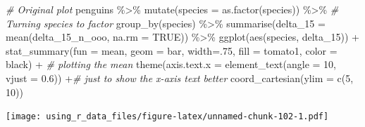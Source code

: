 \documentclass[
]{book}
\newenvironment{Shaded}{\begin{snugshade}}{\end{snugshade}}
\newcommand{\AttributeTok}[1]{\textcolor[rgb]{0.77,0.63,0.00}{#1}}
\newcommand{\CommentTok}[1]{\textcolor[rgb]{0.56,0.35,0.01}{\textit{#1}}}
\newcommand{\ConstantTok}[1]{\textcolor[rgb]{0.00,0.00,0.00}{#1}}
\newcommand{\DecValTok}[1]{\textcolor[rgb]{0.00,0.00,0.81}{#1}}
\newcommand{\FloatTok}[1]{\textcolor[rgb]{0.00,0.00,0.81}{#1}}
\newcommand{\FunctionTok}[1]{\textcolor[rgb]{0.00,0.00,0.00}{#1}}
\newcommand{\NormalTok}[1]{#1}
\newcommand{\SpecialCharTok}[1]{\textcolor[rgb]{0.00,0.00,0.00}{#1}}
\newcommand{\StringTok}[1]{\textcolor[rgb]{0.31,0.60,0.02}{#1}}
\begin{document}
\begin{Shaded}
\begin{Highlighting}[]
\CommentTok{\# Original plot}
\NormalTok{penguins }\SpecialCharTok{\%\textgreater{}\%} 
  \FunctionTok{mutate}\NormalTok{(}\AttributeTok{species =} \FunctionTok{as.factor}\NormalTok{(species)) }\SpecialCharTok{\%\textgreater{}\%}  \CommentTok{\# Turning species to factor}
  \FunctionTok{group\_by}\NormalTok{(species) }\SpecialCharTok{\%\textgreater{}\%} 
  \FunctionTok{summarise}\NormalTok{(}\AttributeTok{delta\_15 =} \FunctionTok{mean}\NormalTok{(delta\_15\_n\_ooo, }\AttributeTok{na.rm =} \ConstantTok{TRUE}\NormalTok{)) }\SpecialCharTok{\%\textgreater{}\%} 
  \FunctionTok{ggplot}\NormalTok{(}\FunctionTok{aes}\NormalTok{(species, delta\_15)) }\SpecialCharTok{+}
  \FunctionTok{stat\_summary}\NormalTok{(}\AttributeTok{fun =}\NormalTok{ mean, }\AttributeTok{geom =} \StringTok{\textquotesingle{}bar\textquotesingle{}}\NormalTok{, }\AttributeTok{width=}\NormalTok{.}\DecValTok{75}\NormalTok{, }\AttributeTok{fill =} \StringTok{\textquotesingle{}tomato1\textquotesingle{}}\NormalTok{, }\AttributeTok{color =} \StringTok{\textquotesingle{}black\textquotesingle{}}\NormalTok{) }\SpecialCharTok{+}  \CommentTok{\# plotting the mean}
  \FunctionTok{theme}\NormalTok{(}\AttributeTok{axis.text.x =} \FunctionTok{element\_text}\NormalTok{(}\AttributeTok{angle =} \DecValTok{10}\NormalTok{, }\AttributeTok{vjust =} \FloatTok{0.6}\NormalTok{)) }\SpecialCharTok{+}\CommentTok{\# just to show the x{-}axis text better}
  \FunctionTok{coord\_cartesian}\NormalTok{(}\AttributeTok{ylim =} \FunctionTok{c}\NormalTok{(}\DecValTok{5}\NormalTok{, }\DecValTok{10}\NormalTok{))}
\end{Highlighting}
\end{Shaded}

\texttt{[image: using\_r\_data\_files/figure-latex/unnamed-chunk-102-1.pdf]}
\end{document}
